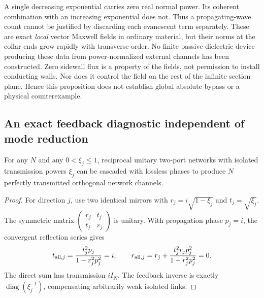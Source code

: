 \begin{remark}
\label{cx:evanescent-scope}
A single decreasing exponential carries zero real normal power. Its
coherent combination with an increasing exponential does not. Thus a
propagating-wave count cannot be justified by discarding each evanescent
term separately. These are exact \emph{local} vector Maxwell fields in
ordinary material, but their norms at the collar ends grow rapidly with
transverse order. No finite passive dielectric device producing these
data from power-normalized external channels has been constructed.
Zero sidewall flux is a property of the fields, not permission to install
conducting walls. Nor does it control the field on the rest of the
infinite section plane. Hence this proposition does not establish
global absolute bypass or a physical counterexample.
\end{remark}

\subsection{An exact feedback diagnostic independent of mode reduction}

\begin{proposition}
\label{cx:mirror-network}
For any $N$ and any $0<\xi_j\leq1$, reciprocal unitary two-port networks
with isolated transmission powers $\xi_j$ can be cascaded with lossless
phases to produce $N$ perfectly transmitted orthogonal network channels.
\end{proposition}

\begin{proof}
For direction $j$, use two identical mirrors with
$r_j=i\sqrt{1-\xi_j}$ and $t_j=\sqrt{\xi_j}$. The symmetric matrix
$\left(\begin{smallmatrix}r_j&t_j\\t_j&r_j\end{smallmatrix}\right)$
is unitary. With propagation phase $p_j=i$, the convergent reflection
series gives
\begin{equation}
 t_{{\rm all},j}=\frac{t_j^2p_j}{1-r_j^2p_j^2}=i,
 \qquad
 r_{{\rm all},j}=r_j+
       \frac{t_j^2r_jp_j^2}{1-r_j^2p_j^2}=0.
 \label{cx:mirror-feedback}
\end{equation}
The direct sum has transmission $iI_N$. The feedback inverse is exactly
$\operatorname{diag}(\xi_j^{-1})$, compensating arbitrarily weak isolated
links.
\end{proof}

